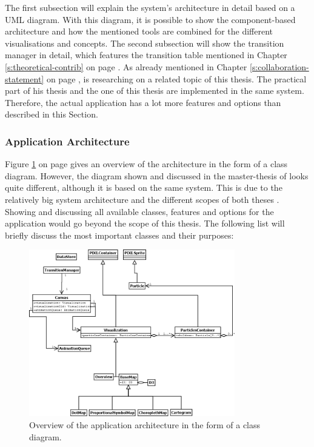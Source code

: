 The first subsection will explain the system's architecture in detail based on a \ac{UML} diagram. With this diagram, it is possible to show the component-based architecture and how the mentioned tools are combined for the different visualisations and concepts. The second subsection will show the transition manager in detail, which features the transition table mentioned in Chapter \ref{s:theoretical-contrib} on page \pageref{s:theoretical-contrib}.
As already mentioned in Chapter \ref{s:collaboration-statement} on page \pageref{s:collaboration-statement}, \citeauthor{Wanko2016} is researching on a related topic of this thesis. The practical part of his thesis and the one of this thesis are implemented in the same system. Therefore, the actual application has a lot more features and options than described in this Section.

\subsubsection{Application Architecture}
Figure \ref{fig:uml-practical-approach} on page \pageref{fig:uml-practical-approach} gives an overview of the architecture in the form of a class diagram. However, the diagram shown and discussed in the master-thesis of \citeauthor{Wanko2016} looks quite different, although it is based on the same system. This is due to the relatively big system architecture and the different scopes of both theses . Showing and discussing all available classes, features and options for the application would go beyond the scope of this thesis. The following list will briefly discuss the most important classes and their purposes:

\begin{figure}[!htb]
\centering
\includegraphics[width=0.8\textwidth,keepaspectratio]{images/results/dia.png}
\caption[
    Overview of the application architecture in the form of a class diagram.
]{Overview of the application architecture in the form of a class diagram.}
\label{fig:uml-practical-approach}
\end{figure}

